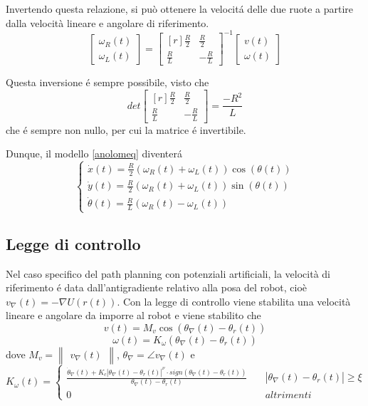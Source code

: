 \documentclass[14pt,a4paper]{extarticle}
\begin{document}
Invertendo questa relazione, si può ottenere la velocitá delle due ruote a partire dalla velocità lineare e angolare di riferimento.
\begin{equation}
\label{wrwl}
\begin{bmatrix}
\omega_R(t) \\
\omega_L(t)
\end{bmatrix}
=
\begin{bmatrix*}[r]
\frac{R}{2} & \frac{R}{2} \\
\frac{R}{L} & -\frac{R}{L}
\end{bmatrix*}^{-1}
\begin{bmatrix}
v(t) \\
\omega(t)
\end{bmatrix}
\end{equation}

Questa inversione é sempre possibile, visto che
\[det\begin{bmatrix*}[r]
\frac{R}{2} & \frac{R}{2} \\
\frac{R}{L} & -\frac{R}{L}
\end{bmatrix*} = \frac{-R^2}{L}\] che é sempre non nullo, per cui la matrice é invertibile.

Dunque, il modello \ref{anolomeq} diventerá
\begin{equation}
\label{DDeq}
\begin{cases}
\dot{x}(t) = \frac{R}{2} \left( \omega_R(t)+\omega_L(t) \right) \cos(\theta(t)) \\
\dot{y}(t) = \frac{R}{2} \left( \omega_R(t)+\omega_L(t) \right)\sin(\theta(t)) \\
\dot{\theta}(t) = \frac{R}{L} \left( \omega_R(t)-\omega_L(t) \right)
\end{cases}
\end{equation} 

\subsection{Legge di controllo}

Nel caso specifico del path planning con potenziali artificiali, la velocità di riferimento é data dall'antigradiente relativo alla posa del robot, cioè \(v_\nabla(t) = -\nabla U(r(t))\). Con la legge di controllo viene stabilita una velocità lineare e angolare da imporre al robot e viene stabilito che
\begin{equation}
v(t) = M_v \cos(\theta_{\nabla}(t) - \theta_r(t))
\end{equation} 
\begin{equation}
\omega(t) = K_{\omega}(\theta_{\nabla}(t) - \theta_r(t))
\end{equation} dove \(M_v=\begin{Vmatrix}v_{\nabla}(t)\end{Vmatrix}\), \(\theta_{\nabla}=\angle v_{\nabla}(t)\) e 
\[K_{\omega}(t)= \begin{cases}
\frac{\dot{\theta}_{\nabla}(t) + K_c|\theta_{\nabla}(t)-\theta_r(t)|^{\nu} \cdot sign(\theta_{\nabla}(t) - \theta_r(t))}{\theta_{\nabla}(t) - \theta_r(t)} \quad &|\theta_{\nabla}(t)-\theta_r(t)| \geq \xi \\
0 \quad &altrimenti
\end{cases}\]
\end{document}
